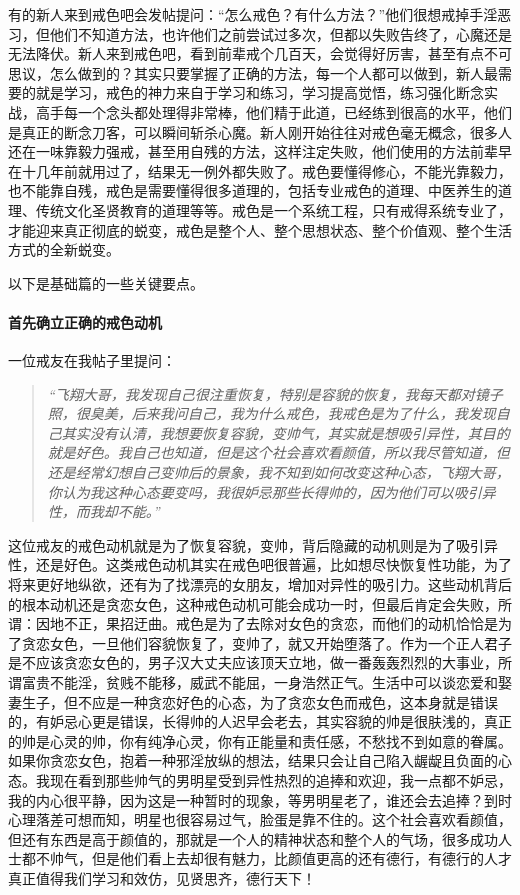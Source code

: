 有的新人来到戒色吧会发帖提问：“怎么戒色？有什么方法？”他们很想戒掉手淫恶习，但他们不知道方法，也许他们之前尝试过多次，但都以失败告终了，心魔还是无法降伏。新人来到戒色吧，看到前辈戒个几百天，会觉得好厉害，甚至有点不可思议，怎么做到的？其实只要掌握了正确的方法，每一个人都可以做到，新人最需要的就是学习，戒色的神力来自于学习和练习，学习提高觉悟，练习强化断念实战，高手每一个念头都处理得非常棒，他们精于此道，已经练到很高的水平，他们是真正的断念刀客，可以瞬间斩杀心魔。新人刚开始往往对戒色毫无概念，很多人还在一味靠毅力强戒，甚至用自残的方法，这样注定失败，他们使用的方法前辈早在十几年前就用过了，结果无一例外都失败了。戒色要懂得修心，不能光靠毅力，也不能靠自残，戒色是需要懂得很多道理的，包括专业戒色的道理、中医养生的道理、传统文化圣贤教育的道理等等。戒色是一个系统工程，只有戒得系统专业了，才能迎来真正彻底的蜕变，戒色是整个人、整个思想状态、整个价值观、整个生活方式的全新蜕变。

以下是基础篇的一些关键要点。

\paragraph{首先确立正确的戒色动机}

一位戒友在我帖子里提问：

\begin{quote}\it
    “飞翔大哥，我发现自己很注重恢复，特别是容貌的恢复，我每天都对镜子照，很臭美，后来我问自己，我为什么戒色，我戒色是为了什么，我发现自己其实没有认清，我想要恢复容貌，变帅气，其实就是想吸引异性，其目的就是好色。我自己也知道，但是这个社会喜欢看颜值，所以我尽管知道，但还是经常幻想自己变帅后的景象，我不知到如何改变这种心态，飞翔大哥，你认为我这种心态要变吗，我很妒忌那些长得帅的，因为他们可以吸引异性，而我却不能。”
\end{quote}

这位戒友的戒色动机就是为了恢复容貌，变帅，背后隐藏的动机则是为了吸引异性，还是好色。这类戒色动机其实在戒色吧很普遍，比如想尽快恢复性功能，为了将来更好地纵欲，还有为了找漂亮的女朋友，增加对异性的吸引力。这些动机背后的根本动机还是贪恋女色，这种戒色动机可能会成功一时，但最后肯定会失败，所谓：因地不正，果招迂曲。戒色是为了去除对女色的贪恋，而他们的动机恰恰是为了贪恋女色，一旦他们容貌恢复了，变帅了，就又开始堕落了。作为一个正人君子是不应该贪恋女色的，男子汉大丈夫应该顶天立地，做一番轰轰烈烈的大事业，所谓富贵不能淫，贫贱不能移，威武不能屈，一身浩然正气。生活中可以谈恋爱和娶妻生子，但不应是一种贪恋好色的心态，为了贪恋女色而戒色，这本身就是错误的，有妒忌心更是错误，长得帅的人迟早会老去，其实容貌的帅是很肤浅的，真正的帅是心灵的帅，你有纯净心灵，你有正能量和责任感，不愁找不到如意的眷属。如果你贪恋女色，抱着一种邪淫放纵的想法，结果只会让自己陷入龌龊且负面的心态。我现在看到那些帅气的男明星受到异性热烈的追捧和欢迎，我一点都不妒忌，我的内心很平静，因为这是一种暂时的现象，等男明星老了，谁还会去追捧？到时心理落差可想而知，明星也很容易过气，脸蛋是靠不住的。这个社会喜欢看颜值，但还有东西是高于颜值的，那就是一个人的精神状态和整个人的气场，很多成功人士都不帅气，但是他们看上去却很有魅力，比颜值更高的还有德行，有德行的人才真正值得我们学习和效仿，见贤思齐，德行天下！

